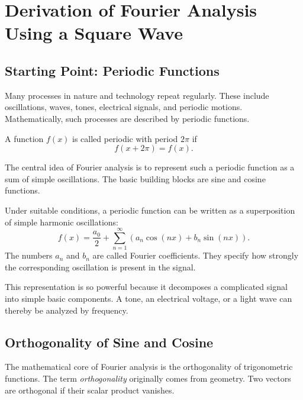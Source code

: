 
\section{Derivation of Fourier Analysis Using a Square Wave}
\label{sec:anhang_fourieranalyse_rechtecksignal}

\subsection{Starting Point: Periodic Functions}

Many processes in nature and technology repeat regularly.
These include oscillations, waves, tones, electrical signals, and periodic motions.
Mathematically, such processes are described by periodic functions.

A function \(f(x)\) is called periodic with period \(2\pi\) if
\[
f(x+2\pi)=f(x).
\]

The central idea of Fourier analysis is
to represent such a periodic function as a sum of simple oscillations.
The basic building blocks are sine and cosine functions.

\begin{MathBox}
	\small
	\label{box:anhangA-fourier-grundidee}
	Under suitable conditions, a periodic function can be written as a superposition
	of simple harmonic oscillations:
	\[
	f(x)=\frac{a_0}{2}
	+\sum_{n=1}^{\infty}
	\left(a_n\cos(nx)+b_n\sin(nx)\right).
	\]
	The numbers \(a_n\) and \(b_n\) are called Fourier coefficients.
	They specify how strongly the corresponding oscillation is present in the signal.
\end{MathBox}

This representation is so powerful
because it decomposes a complicated signal into simple basic components.
A tone, an electrical voltage, or a light wave can thereby be analyzed by frequency.

\subsection{Orthogonality of Sine and Cosine}

The mathematical core of Fourier analysis is the orthogonality of trigonometric functions.
The term \emph{orthogonality} originally comes from geometry.
Two vectors are orthogonal if their scalar product vanishes.

